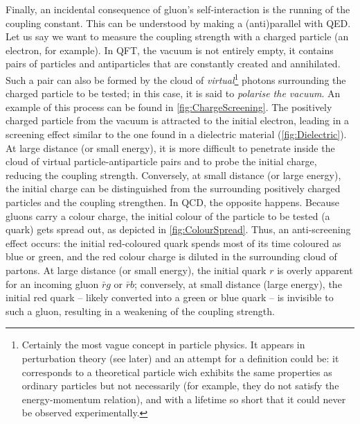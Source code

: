 Finally, an incidental consequence of gluon's self-interaction is the running of the coupling constant. This can be understood by making a (anti)parallel with QED. Let us say we want to measure the coupling strength with a charged particle (an electron, for example). In QFT, the vacuum is not entirely empty, it contains pairs of particles and antiparticles that are constantly created and annihilated. Such a pair can also be formed by the cloud of \textit{virtual}\footnote{Certainly the most vague concept in particle physics. It appears in perturbation theory (see later) and an attempt for a definition could be: it corresponds to a theoretical particle wich exhibits the same properties as ordinary particles but not necessarily (for example, they do not satisfy the energy-momentum relation), and with a lifetime so short that it could never be observed experimentally.} photons surrounding the charged particle to be tested; in this case, it is said to \textit{polarise the vacuum}. An example of this process can be found in \fig\ref{fig:ChargeScreening}. The positively charged particle from the vacuum is attracted to the initial electron, leading in a screening effect similar to the one found in a dielectric material (\fig\ref{fig:Dielectric}). At large distance (or small energy), it is more difficult to penetrate inside the cloud of virtual particle-antiparticle pairs and to probe the initial charge, reducing the coupling strength. Conversely, at small distance (or large energy), the initial charge can be distinguished from the surrounding positively charged particles and the coupling strengthen. In QCD, the opposite happens.  Because gluons carry a colour charge, the initial colour of the particle to be tested (a quark) gets spread out, as depicted in \fig\ref{fig:ColourSpread}. Thus, an anti-screening effect occurs: the initial red-coloured quark spends most of its time coloured as blue or green, and the red colour charge is diluted in the surrounding cloud of partons. At large distance (or small energy), the initial quark $r$ is overly apparent for an incoming gluon $\bar{r}g$ or $\bar{r}b$; conversely, at small distance (large energy), the initial red quark -- likely converted into a green or blue quark -- is invisible to such a gluon, resulting in a weakening of the coupling strength. \\

